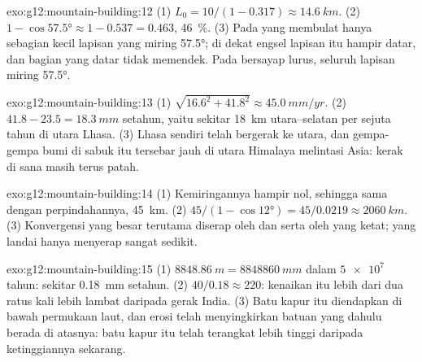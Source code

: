 \begin{solution}{exo:g12:mountain-building:12}
(1) $L_0 = 10/(1 - 0.317) \approx \qty{14.6}{km}$. (2) $1 - \cos\ang{57.5}
\approx 1 - 0.537 = 0.463$, \qty{46}{\percent}. (3) Pada  yang membulat
hanya sebagian kecil lapisan yang miring \ang{57.5}; di dekat engsel lapisan itu
hampir datar, dan bagian yang datar tidak memendek. Pada  bersayap lurus,
seluruh lapisan miring \ang{57.5}.
\end{solution}

\begin{solution}{exo:g12:mountain-building:13}
(1) $\sqrt{16.6^2 + 41.8^2} \approx \qty{45.0}{mm/yr}$. (2) $41.8 - 23.5 =
\qty{18.3}{mm}$ setahun, yaitu sekitar \qty{18}{km}  utara--selatan
per sejuta tahun di utara Lhasa. (3) Lhasa sendiri telah bergerak ke utara,
dan gempa-gempa bumi di sabuk itu tersebar jauh di utara Himalaya melintasi
Asia: kerak di sana masih terus patah.
\end{solution}

\begin{solution}{exo:g12:mountain-building:14}
(1) Kemiringannya hampir nol, sehingga  sama dengan perpindahannya,
\qty{45}{km}. (2) $45/(1 - \cos\ang{12}) = 45/0.0219 \approx \qty{2060}{km}$.
(3) Konvergensi yang besar terutama diserap oleh  dan  serta
oleh  yang ketat;  yang landai hanya menyerap sangat sedikit.
\end{solution}

\begin{solution}{exo:g12:mountain-building:15}
(1) $\qty{8848.86}{m} = \qty{8848860}{mm}$ dalam $\num{5e7}$ tahun: sekitar
\qty{0.18}{mm} setahun. (2) $40/0.18 \approx 220$: kenaikan itu lebih dari dua
ratus kali lebih lambat daripada gerak India. (3) Batu kapur itu diendapkan di
bawah permukaan laut, dan erosi telah menyingkirkan batuan yang dahulu berada di
atasnya: batu kapur itu telah terangkat lebih tinggi daripada ketinggiannya
sekarang.
\end{solution}

